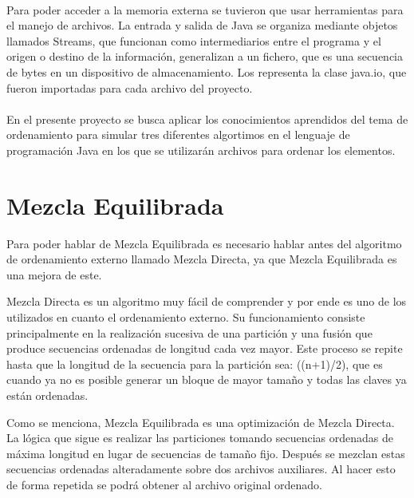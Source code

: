 \documentclass[11pt]{article}
\begin{document}
\paragraph{}
Para poder acceder a la memoria externa se tuvieron que usar herramientas para el manejo de archivos. La entrada y salida de Java se organiza mediante objetos llamados Streams, que funcionan como intermediarios entre el programa y el origen o destino de la información, generalizan a un fichero, que es una secuencia de bytes en un dispositivo de almacenamiento. Los representa la clase java.io, que fueron importadas para cada archivo del proyecto. 

\paragraph{}
En el presente proyecto se busca aplicar los conocimientos aprendidos del tema de ordenamiento para simular tres diferentes algortimos en el lenguaje de programación Java en los que se utilizarán archivos para ordenar los elementos. 


\section{Mezcla Equilibrada}
Para poder hablar de Mezcla Equilibrada es necesario hablar antes del algoritmo de ordenamiento externo llamado Mezcla Directa, ya que Mezcla Equilibrada es una mejora de este.
\par
Mezcla Directa es un algoritmo muy fácil de comprender y por ende es uno de los utilizados en cuanto el ordenamiento externo. Su funcionamiento consiste principalmente en la realización sucesiva de una partición y una fusión que produce secuencias ordenadas de longitud cada vez mayor. Este proceso se repite hasta que la longitud de la secuencia para la partición sea: ((n+1)/2), que es cuando ya no es posible generar un bloque de mayor tamaño y todas las claves ya están ordenadas.
\par
Como se menciona, Mezcla Equilibrada es una optimización de Mezcla Directa.  La lógica que sigue es realizar las particiones tomando secuencias ordenadas de máxima longitud en lugar de secuencias de tamaño fijo. Después se mezclan estas secuencias ordenadas alteradamente sobre dos archivos auxiliares. Al hacer esto de forma repetida se podrá obtener al archivo original ordenado.
\end{document}
